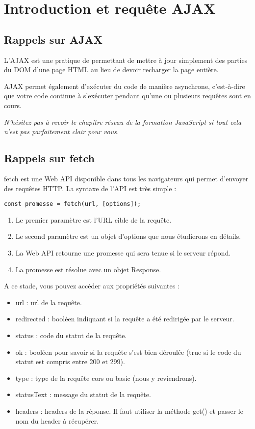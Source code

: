 \section{Introduction et requête AJAX}
\subsection{Rappels sur {\color{monOrange}AJAX}}
L'{\color{monOrange}AJAX} est une pratique de permettant de mettre à jour simplement des parties du DOM d'une page HTML au lieu de devoir recharger la page entière.

AJAX permet également d'exécuter du code de manière asynchrone, c'est-à-dire que votre code continue à s'exécuter pendant qu'une ou plusieurs requêtes sont en cours.

{\em N'hésitez pas à revoir le chapitre réseau de la formation JavaScript si tout cela n'est pas parfaitement clair pour vous.}

\subsection{Rappels sur fetch}
{\color{monOrange}fetch} est une {\color{monOrange}Web API} disponible dans tous les navigateurs qui permet d'envoyer des requêtes {\color{monOrange}HTTP}. La syntaxe de l'{\color{monOrange}API} est très simple :
\begin{verbatim}
const promesse = fetch(url, [options]);
\end{verbatim}
\begin{enumerate}
\item Le premier paramètre est l'URL cible de la requête.
\item Le second paramètre est un objet d'options que nous étudierons en détails.
\item La Web API retourne une promesse qui sera tenue si le serveur répond.
\item La promesse est résolue avec un objet Response.
\end{enumerate}
A ce stade, vous pouvez accéder aux propriétés suivantes :
\begin{itemize}
\item {\color{monOrange}url :} url de la requête.
\item {\color{monOrange}redirected :} booléen indiquant si la requête a été redirigée par le serveur.
\item {\color{monOrange}status :} code du statut de la requête.
\item {\color{monOrange}ok :} booléen pour savoir si la requête s'est bien déroulée (true si le code du statut est compris entre 200 et 299).
\item {\color{monOrange}type :} type de la requête cors ou basic (nous y reviendrons).
\item {\color{monOrange}statusText :} message du statut de la requête.
\item {\color{monOrange}headers :} headers de la réponse. Il faut utiliser la méthode get() et passer le nom du header à récupérer.
\end{itemize}
